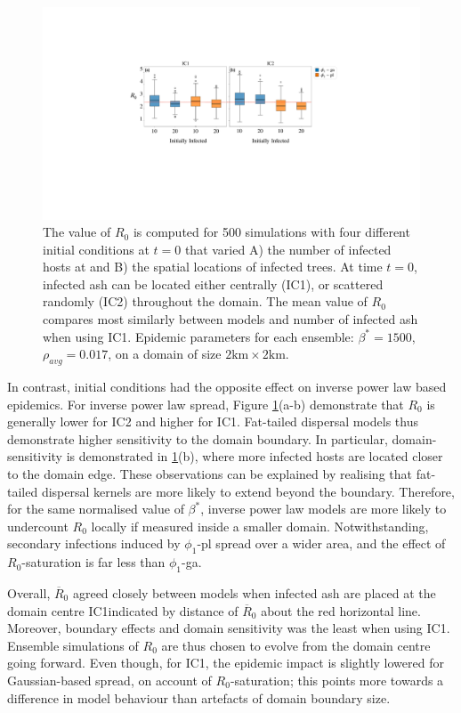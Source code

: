 \begin{figure}
    \centering
    \includegraphics[scale=0.45]{chapter6/figures/fig5-IC.pdf}
    \caption{The value of $R_0$ is computed for 500 simulations with four different initial conditions at $t=0$ that varied A) the number of infected hosts at and B) the spatial locations of infected trees. 
    At time $t=0$, infected ash can be located either centrally (IC1), or scattered randomly (IC2) throughout the domain.
    The mean value of $R_0$ compares most similarly between models and number of infected ash when using IC1.
    Epidemic parameters for each ensemble: $\beta^*=1500$, $\rho_{avg}=0.017$, on a domain of size $\mathrm{2km\times 2km}$.}
    \label{fig:seir-ash-IC}
\end{figure}

In contrast, initial conditions had the opposite effect on inverse power law based epidemics.
For inverse power law spread, Figure \ref{fig:seir-ash-IC}(a-b) demonstrate that $R_0$ is generally lower for IC2 and higher for IC1.
Fat-tailed dispersal models thus demonstrate higher sensitivity to the domain boundary.
In particular, domain-sensitivity is demonstrated in \ref{fig:seir-ash-IC}(b), where more infected hosts are located closer to the domain edge.
These observations can be explained by realising that fat-tailed dispersal kernels are more likely to extend beyond the boundary.
Therefore, for the same normalised value of $\beta^*$, inverse power law models are more likely to undercount $R_0$ locally if measured inside a smaller domain.
Notwithstanding, secondary infections induced by $\phi_1$-pl spread over a wider area, and the effect of $R_0$-saturation is far less than $\phi_1$-ga.

Overall, $\overline{R}_0$ agreed closely between models when infected ash are placed at the domain centre IC1\textemdash indicated by distance of $\overline{R}_0$ about the red horizontal line.
Moreover, boundary effects and domain sensitivity was the least when using IC1.
Ensemble simulations of $R_0$ are thus chosen to evolve from the domain centre going forward.
Even though, for IC1, the epidemic impact is slightly lowered for Gaussian-based spread, on account of $R_0$-saturation; 
this points more towards a difference in model behaviour than artefacts of domain boundary size.



